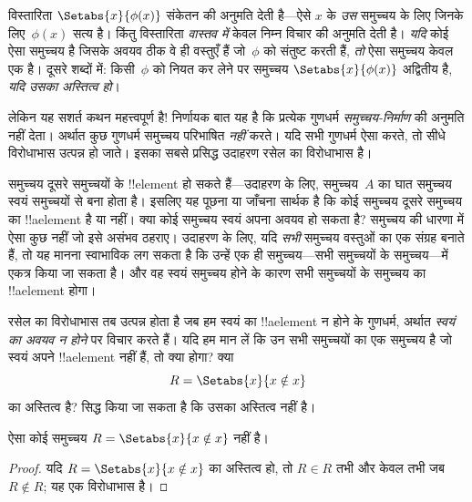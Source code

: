 \documentclass[../../../include/open-logic-section]{subfiles}
\begin{document}

विस्तारिता $\Setabs{x}{\phi(x)}$ संकेतन की अनुमति देती है---ऐसे $x$ के
\emph{उस} समुच्चय के लिए जिनके लिए~$\phi(x)$ सत्य है। किंतु विस्तारिता
\emph{वास्तव में} केवल निम्न विचार की अनुमति देती है। \emph{यदि} कोई
ऐसा समुच्चय है जिसके अवयव ठीक वे ही वस्तुएँ हैं जो~$\phi$ को संतुष्ट
करती हैं, \emph{तो} ऐसा समुच्चय केवल एक है। दूसरे शब्दों में:
किसी~$\phi$ को नियत कर लेने पर समुच्चय
$\Setabs{x}{\phi(x)}$ अद्वितीय है, \emph{यदि उसका अस्तित्व हो}।

लेकिन यह सशर्त कथन महत्त्वपूर्ण है!{} निर्णायक बात यह है कि प्रत्येक
गुणधर्म \emph{समुच्चय-निर्माण} की अनुमति नहीं देता। अर्थात कुछ गुणधर्म
समुच्चय परिभाषित \emph{नहीं} करते। यदि सभी गुणधर्म ऐसा करते, तो सीधे
विरोधाभास उत्पन्न हो जाते। इसका सबसे प्रसिद्ध उदाहरण रसेल का
विरोधाभास है।

समुच्चय दूसरे समुच्चयों के !!{element} हो सकते हैं---उदाहरण के लिए,
समुच्चय~$A$ का घात समुच्चय स्वयं समुच्चयों से बना होता है। इसलिए यह
पूछना या जाँचना सार्थक है कि कोई समुच्चय दूसरे समुच्चय का
!!a{element} है या नहीं। क्या कोई समुच्चय स्वयं अपना अवयव हो सकता है?
समुच्चय की धारणा में ऐसा कुछ नहीं जो इसे असंभव ठहराए। उदाहरण के लिए,
यदि \emph{सभी} समुच्चय वस्तुओं का एक संग्रह बनाते हैं, तो यह मानना
स्वाभाविक लग सकता है कि उन्हें एक ही समुच्चय---सभी समुच्चयों के
समुच्चय---में एकत्र किया जा सकता है। और वह स्वयं समुच्चय होने के कारण
सभी समुच्चयों के समुच्चय का !!a{element} होगा।

रसेल का विरोधाभास तब उत्पन्न होता है जब हम स्वयं का !!a{element} न
होने के गुणधर्म, अर्थात \emph{स्वयं का अवयव न होने} पर विचार करते हैं।
यदि हम मान लें कि उन सभी समुच्चयों का एक समुच्चय है जो स्वयं अपने
!!a{element} नहीं हैं, तो क्या होगा? क्या
\[
R = \Setabs{x}{x \notin x}
\]
का अस्तित्व है? सिद्ध किया जा सकता है कि उसका अस्तित्व नहीं है।

\begin{thm}[रसेल का विरोधाभास]
	ऐसा कोई समुच्चय $R = \Setabs{x}{x \notin x}$ नहीं है।
\end{thm}

\begin{proof}
यदि $R = \Setabs{x}{x \notin x}$ का अस्तित्व हो, तो
$R \in R$ तभी और केवल तभी जब $R \notin R$; यह एक विरोधाभास है।
\end{proof}
\end{document}
